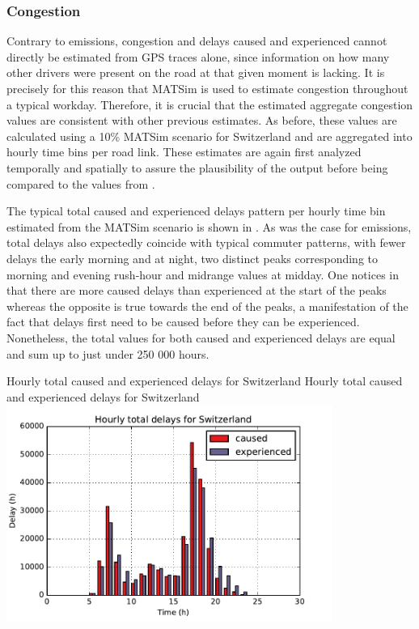 \subsubsection{Congestion}

Contrary to emissions, congestion and delays caused and experienced cannot directly be estimated from GPS traces alone, since information on how many other drivers were present on the road at that given moment is lacking.
It is precisely for this reason that MATSim is used to estimate congestion throughout a typical workday.
Therefore, it is crucial that the estimated aggregate congestion values are consistent with other previous estimates.
As before, these values are calculated using a 10\% MATSim scenario for Switzerland and are aggregated into hourly time bins per road link.
These estimates are again first analyzed temporally and spatially to assure the plausibility of the output before being compared to the values from \citet{mkinfras2016staukosten}.

The typical total caused and experienced delays pattern per hourly time bin estimated from the MATSim scenario is shown in .
As was the case for emissions, total delays also expectedly coincide with typical commuter patterns, with fewer delays the early morning and at night, two distinct peaks corresponding to morning and evening rush-hour and midrange values at midday.
One notices in  that there are more caused delays than experienced at the start of the peaks whereas the opposite is true towards the end of the peaks, a manifestation of the fact that delays first need to be caused before they can be experienced.
Nonetheless, the total values for both caused and experienced delays are equal and sum up to just under 250 000 hours.


\createfigure%
{Hourly total caused and experienced delays for Switzerland}%
{Hourly total caused and experienced delays for Switzerland}%
{\label{fig:hourlyDelays}}%
{\includegraphics[width=0.8\textwidth,
angle=0]{figures/hourly_delays.pdf}}%
{}

